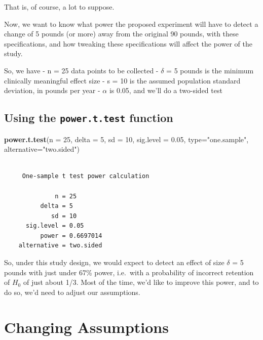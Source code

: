\documentclass[
]{book}
\newenvironment{Shaded}{\begin{snugshade}}{\end{snugshade}}
\newcommand{\DataTypeTok}[1]{\textcolor[rgb]{0.13,0.29,0.53}{#1}}
\newcommand{\DecValTok}[1]{\textcolor[rgb]{0.00,0.00,0.81}{#1}}
\newcommand{\FloatTok}[1]{\textcolor[rgb]{0.00,0.00,0.81}{#1}}
\newcommand{\KeywordTok}[1]{\textcolor[rgb]{0.13,0.29,0.53}{\textbf{#1}}}
\newcommand{\NormalTok}[1]{#1}
\newcommand{\StringTok}[1]{\textcolor[rgb]{0.31,0.60,0.02}{#1}}
\begin{document}
That is, of course, a lot to suppose.

Now, we want to know what power the proposed experiment will have to detect a change of 5 pounds (or more) away from the original 90 pounds, with these specifications, and how tweaking these specifications will affect the power of the study.

So, we have
- n = 25 data points to be collected
- \(\delta\) = 5 pounds is the minimum clinically meaningful effect size
- s = 10 is the assumed population standard deviation, in pounds per year
- \(\alpha\) is 0.05, and we'll do a two-sided test

\hypertarget{using-the-power.t.test-function}{%
\subsection{\texorpdfstring{Using the \texttt{power.t.test} function}{Using the power.t.test function}}\label{using-the-power.t.test-function}}

\begin{Shaded}
\begin{Highlighting}[]
\KeywordTok{power.t.test}\NormalTok{(}\DataTypeTok{n =} \DecValTok{25}\NormalTok{, }\DataTypeTok{delta =} \DecValTok{5}\NormalTok{, }\DataTypeTok{sd =} \DecValTok{10}\NormalTok{, }\DataTypeTok{sig.level =} \FloatTok{0.05}\NormalTok{, }
             \DataTypeTok{type=}\StringTok{"one.sample"}\NormalTok{, }\DataTypeTok{alternative=}\StringTok{"two.sided"}\NormalTok{)}
\end{Highlighting}
\end{Shaded}

\begin{verbatim}

     One-sample t test power calculation 

              n = 25
          delta = 5
             sd = 10
      sig.level = 0.05
          power = 0.6697014
    alternative = two.sided
\end{verbatim}

So, under this study design, we would expect to detect an effect of size \(\delta\) = 5 pounds with just under 67\% power, i.e.~with a probability of incorrect retention of \(H_0\) of just about 1/3. Most of the time, we'd like to improve this power, and to do so, we'd need to adjust our assumptions.

\hypertarget{changing-assumptions}{%
\section{Changing Assumptions}\label{changing-assumptions}}
\end{document}
